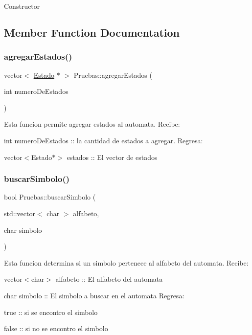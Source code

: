Constructor 

\subsection{Member Function Documentation}
\mbox{\label{class_pruebas_a7d80b5a28534edbf0f92f56e8e423f3e}} 
\subsubsection{\texorpdfstring{agregar\+Estados()}{agregarEstados()}}
{\footnotesize\ttfamily vector$<$ \hyperlink{class_estado}{Estado} $\ast$ $>$ Pruebas\+::agregar\+Estados (\begin{DoxyParamCaption}\item[{int}]{numero\+De\+Estados }\end{DoxyParamCaption})}

Esta funcion permite agregar estados al automata. Recibe\+:
\begin{DoxyItemize}
\item int numero\+De\+Estados \+:\+: la cantidad de estados a agregar. Regresa\+:
\item vector$<$\+Estado$\ast$$>$ estados \+:\+: El vector de estados 
\end{DoxyItemize}\mbox{\label{class_pruebas_ab1eda5c03c5298ba35c48845ff6544eb}} 
\subsubsection{\texorpdfstring{buscar\+Simbolo()}{buscarSimbolo()}}
{\footnotesize\ttfamily bool Pruebas\+::buscar\+Simbolo (\begin{DoxyParamCaption}\item[{std\+::vector$<$ char $>$}]{alfabeto,  }\item[{char}]{simbolo }\end{DoxyParamCaption})}

Esta funcion determina si un simbolo pertenece al alfabeto del automata. Recibe\+:
\begin{DoxyItemize}
\item vector$<$char$>$ alfabeto \+:\+: El alfabeto del automata
\item char simbolo \+:\+: El simbolo a buscar en el automata Regresa\+:
\item true \+:\+: si se encontro el simbolo
\item false \+:\+: si no se encontro el simbolo 
\end{DoxyItemize}\mbox{\label{class_pruebas_a4f7adc9be1f1f9ec96d6a713c728f4cc}} 
